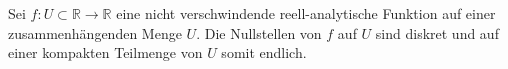 \begin{satz}
%
    Sei $f \colon U \subset \mathbb{R} \to \mathbb{R}$ eine nicht verschwindende reell-analytische Funktion auf einer zusammenhängenden Menge $U$.
    Die Nullstellen von $f$ auf $U$ sind diskret und auf einer kompakten Teilmenge von $U$ somit endlich.
\end{satz}
